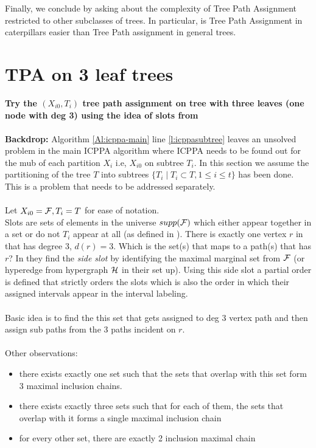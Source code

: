 \documentclass{llncs}
\def\cF{{\cal F}}
\def\cH{{\cal H}}
\begin{document}
\noindent
Finally, we conclude by asking about the complexity of Tree Path
Assignment restricted to other subclasses of trees.  In particular, is
Tree Path Assignment in caterpillars easier than Tree Path assignment
in general trees.


\appendix
\section{TPA on 3 leaf trees}

\noindent
{\bf Try the $(X_{i0}, T_i)$ tree path assignment on tree with three leaves
(one node with deg 3) using the idea of slots from \cite{kklv10}}\\\\

{\bf Backdrop:} Algorithm \ref{Al:icppa-main} line
\ref{l:icppasubtree} leaves an unsolved problem in the main ICPPA
algorithm where ICPPA needs to be found out for the mub of each
partition $X_i$ i.e, $X_{i0}$ on subtree $T_i$. In this section we assume the
partitioning of the tree $T$ into subtrees $\{T_i \mid T_i 
\subset T, 1 \le i \le t\}$ has been done. This is a problem that needs
to be addressed separately.\\\\

\noindent
Let $X_{i0} = \cF, T_i = T$ for ease of notation.\\
Slots are sets of elements in the universe $supp(\cF)$ which either
appear together in a set or do not $T_i$ appear at all (as defined in \cite{kklv10}).
There is exactly one vertex $r$ in that has degree 3, $d(r) = 3$. Which
is the set(s) that maps to a path(s) that has $r$? In \cite{kklv10}
they find the {\em side slot} by identifying the maximal marginal set
from $\cF$ (or hyperedge from hypergraph $\cH$ in their set up). Using
this side slot a partial order is defined that strictly orders the
slots which is also the order in which their assigned intervals appear
in the interval labeling.\\\\
Basic idea is to find the this set that gets assigned to deg 3 vertex
path and then assign sub paths from the 3 paths incident on $r$.\\\\
Other observations: 
\begin{itemize}
\item there exists exactly one set such that the sets
that overlap with this set form 3 maximal inclusion chains.
\item there exists exactly three sets such that for each of them, the
  sets that overlap with it forms a single maximal inclusion chain
\item for every other set, there are exactly 2 inclusion maximal chain
\end{itemize}
\end{document}
